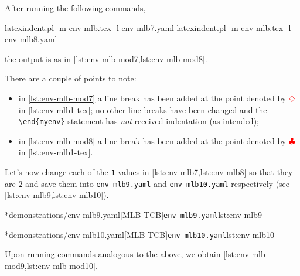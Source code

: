 	After running the following commands,
	\begin{commandshell}
latexindent.pl -m env-mlb.tex -l env-mlb7.yaml
latexindent.pl -m env-mlb.tex -l env-mlb8.yaml
\end{commandshell}
	the output is as in \cref{lst:env-mlb-mod7,lst:env-mlb-mod8}.

	\begin{widepage}
		\begin{minipage}{.42\linewidth}
		\end{minipage}
		\hfill
		\begin{minipage}{.57\linewidth}
		\end{minipage}
	\end{widepage}

	There are a couple of points to note:
	\begin{itemize}
		\item in \cref{lst:env-mlb-mod7} a line break has been added at the point denoted by $\color{red}\diamondsuit$ in \vref{lst:env-mlb1-tex}; no
		      other line breaks have been changed and the \lstinline!\end{myenv}! statement has \emph{not} received indentation (as intended);
		\item in \cref{lst:env-mlb-mod8} a line break has been added at the point denoted by $\color{red}\clubsuit$ in \vref{lst:env-mlb1-tex}.
	\end{itemize}

	Let's now change each of the \texttt{1} values in \cref{lst:env-mlb7,lst:env-mlb8} so that they are $2$ and
	save them into \texttt{env-mlb9.yaml} and \texttt{env-mlb10.yaml} respectively (see \cref{lst:env-mlb9,lst:env-mlb10}).

	\begin{minipage}{.49\textwidth}
		\cmhlistingsfromfile[style=yaml-LST]*{demonstrations/env-mlb9.yaml}[MLB-TCB]{\texttt{env-mlb9.yaml}}{lst:env-mlb9}
	\end{minipage}
	\hfill
	\begin{minipage}{.49\textwidth}
		\cmhlistingsfromfile[style=yaml-LST]*{demonstrations/env-mlb10.yaml}[MLB-TCB]{\texttt{env-mlb10.yaml}}{lst:env-mlb10}
	\end{minipage}

	Upon running  commands analogous to the above, we obtain \cref{lst:env-mlb-mod9,lst:env-mlb-mod10}.

